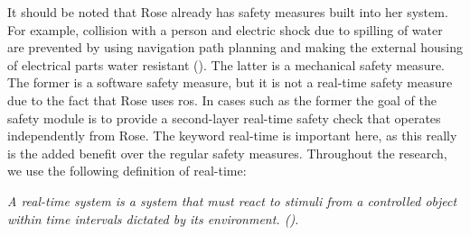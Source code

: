 \documentclass[12pt]{scrreprt}
\begin{document}
 
It should be noted that Rose already has safety measures built into her system. For example, collision with a person and electric shock due to spilling of water are prevented by using navigation path planning and making the external housing of electrical parts water resistant (\cite{risk_analysis}). The latter is a mechanical safety measure. The former is a software safety measure, but it is not a real-time safety measure due to the fact that Rose uses \acrshort{ros}. In cases such as the former the goal of the safety module is to provide a second-layer real-time safety check that operates independently from Rose. The keyword real-time is important here, as this really is the added benefit over the regular safety measures. Throughout the research, we use the following definition of real-time: 

\begin{flushleft}
\textit{
A real-time system is a system that must react to stimuli from a controlled object within time intervals dictated by its environment. (\cite{realtime_systems}).
}
\end{flushleft}
\end{document}

